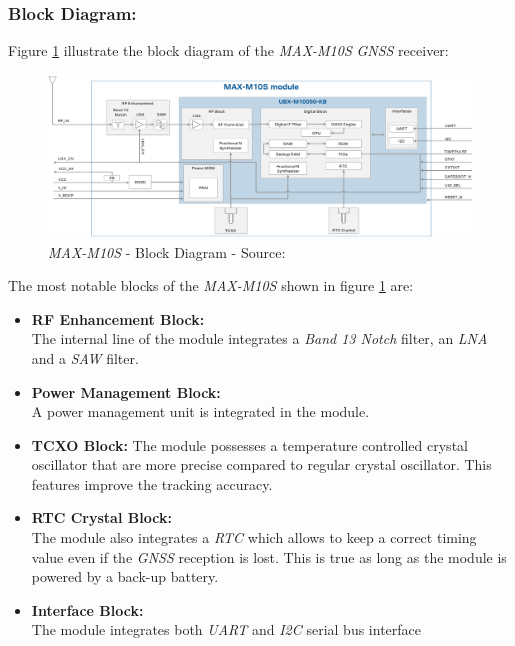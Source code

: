 \documentclass[report.tex]{subfiles}
\begin{document}
\pagebreak
\;\\[-60pt]
\subsubsection{Block Diagram:}

Figure \ref{fig:maxm10s_bloc_diag} illustrate the block diagram of the \textit{MAX-M10S} \textit{GNSS} receiver:

\begin{figure}[H]
	\centering
	\includegraphics[width=1\textwidth]{Include/Figure/comp/maxm10s_bloc_diag.png}
	\caption{\textit{MAX-M10S} - Block Diagram - Source: \cite{MAXM10S}}
	\label{fig:maxm10s_bloc_diag}
\end{figure}

The most notable blocks of the \textit{MAX-M10S} shown in figure \ref{fig:maxm10s_bloc_diag} are:

\begin{itemize}
\item \textbf{RF Enhancement Block:} \\ The internal line of the module integrates a \textit{Band 13 Notch} filter, an \textit{LNA} and a \textit{SAW} filter.
\item \textbf{Power Management Block:} \\ A power management unit is integrated in the module.
\item \textbf{TCXO Block:} The module possesses a temperature controlled crystal oscillator that are more precise compared to regular crystal oscillator. This features improve the tracking accuracy.
\item \textbf{RTC Crystal Block:} \\ The module also integrates a \textit{RTC} which allows to keep a correct timing value even if the \textit{GNSS} reception is lost. This is true as long as the module is powered by a back-up battery.
\item \textbf{Interface Block:} \\ The module integrates both \textit{UART} and \textit{I2C} serial bus interface
\end{itemize}
\;\\[-45pt]
\end{document}
